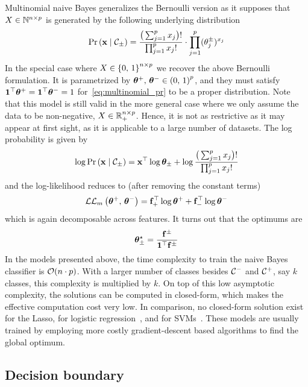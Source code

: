Multinomial naive Bayes generalizes the Bernoulli version
as it supposes that $X \in \mathbb{N}^{n \times p}$ is generated by the following underlying distribution
\begin{equation}\label{eq:multinomial_pr}
    \Pr\left( \mathbf{x} \mid \mathcal{C}_\pm \right) =
        \frac{\big( \sum_{j = 1}^p x_j \big)!}
            {\prod_{j = 1}^p x_j!} \cdot \prod_{j = 1}^p (\theta^\pm_j)^{x_j}
\end{equation}
In the special case where $X \in \left\{ 0,\, 1 \right\}^{n \times p}$ we recover the above Bernoulli formulation.
It is parametrized by $\bm{\theta}^+,\, \bm{\theta}^- \in \left( 0,\, 1 \right)^p$, and they must satisfy
$\mathbf{1}^\top\bm{\theta}^+ = \mathbf{1}^\top\bm{\theta}^- = 1$ for~\ref{eq:multinomial_pr} to be a proper distribution.
Note that this model is still valid in the more general case
where we only assume the data to be non-negative, $X \in \mathbb{R}_+^{n \times p}$.
Hence, it is not as restrictive as it may appear at first sight,
as it is applicable to a large number of datasets.
The log probability is given by
\begin{equation*}
    \log\Pr\left(\mathbf{x} \mid \mathcal{C}_\pm\right) =
        \mathbf{x}^\top\log\bm{\theta}_\pm + \log\frac{\big(\sum_{j = 1}^p x_j\big)!}{\prod_{j = 1}^p x_j!}
\end{equation*}
and the log-likelihood reduces to (after removing the constant terms)
\begin{equation}\label{eq:multinomial_snb_ll}
    \mathcal{L}\mathcal{L}_m\left(\bm{\theta}^+,\, \bm{\theta}^-\right) = \mathbf{f}_+^\top\log\bm{\theta}^+ + \mathbf{f}_-^\top\log\bm{\theta}^-
\end{equation}
which is again decomposable across features.
It turns out that the optimums are
\begin{equation*}
    \bm{\theta}_\pm^\star = \frac{\mathbf{f}^\pm}{\mathbf{1}^\top\mathbf{f}^\pm}
\end{equation*}
\bigbreak
In the models presented above, the time complexity to train the naive Bayes classifier is $\mathcal{O}(n \cdot p)$.
With a larger number of classes besides $\mathcal{C}^-$ and $\mathcal{C}^+$, say $k$ classes, this complexity is multiplied by $k$.
On top of this low asymptotic complexity,
the solutions can be computed in closed-form, which makes the effective computation cost very low.
In comparison, no closed-form solution exist for the Lasso, for logistic regression~\cite{logistic_regression},
and for SVMs~\cite{svm}.
These models are usually trained by employing more costly gradient-descent based algorithms to find the global optimum.

\subsection{Decision boundary}\label{subsec:nb_bound}

